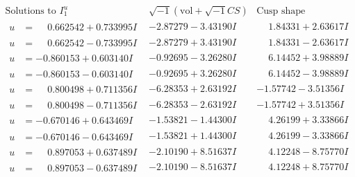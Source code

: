 \documentclass[1p]{elsarticle_modified}
\theoremstyle{definition}
\newcommand{\I}{\sqrt{-1}}
\begin{document}
$$\begin{array}{c|c|c}  
\text{Solutions to }I^u_{1}& \I (\text{vol} + \sqrt{-1}CS) & \text{Cusp shape}\\
 \hline 
\begin{aligned}
u &= \phantom{-}0.662542 + 0.733995 I\end{aligned}
 & -2.87279 - 3.43190 I & \phantom{-}1.84331 + 2.63617 I \\ \hline\begin{aligned}
u &= \phantom{-}0.662542 - 0.733995 I\end{aligned}
 & -2.87279 + 3.43190 I & \phantom{-}1.84331 - 2.63617 I \\ \hline\begin{aligned}
u &= -0.860153 + 0.603140 I\end{aligned}
 & -0.92695 - 3.26280 I & \phantom{-}6.14452 + 3.98889 I \\ \hline\begin{aligned}
u &= -0.860153 - 0.603140 I\end{aligned}
 & -0.92695 + 3.26280 I & \phantom{-}6.14452 - 3.98889 I \\ \hline\begin{aligned}
u &= \phantom{-}0.800498 + 0.711356 I\end{aligned}
 & -6.28353 + 2.63192 I & -1.57742 - 3.51356 I \\ \hline\begin{aligned}
u &= \phantom{-}0.800498 - 0.711356 I\end{aligned}
 & -6.28353 - 2.63192 I & -1.57742 + 3.51356 I \\ \hline\begin{aligned}
u &= -0.670146 + 0.643469 I\end{aligned}
 & -1.53821 - 1.44300 I & \phantom{-}4.26199 + 3.33866 I \\ \hline\begin{aligned}
u &= -0.670146 - 0.643469 I\end{aligned}
 & -1.53821 + 1.44300 I & \phantom{-}4.26199 - 3.33866 I \\ \hline\begin{aligned}
u &= \phantom{-}0.897053 + 0.637489 I\end{aligned}
 & -2.10190 + 8.51637 I & \phantom{-}4.12248 - 8.75770 I \\ \hline\begin{aligned}
u &= \phantom{-}0.897053 - 0.637489 I\end{aligned}
 & -2.10190 - 8.51637 I & \phantom{-}4.12248 + 8.75770 I \\ \hline\begin{aligned}

\end{aligned}
\end{array}$$
\end{document}
